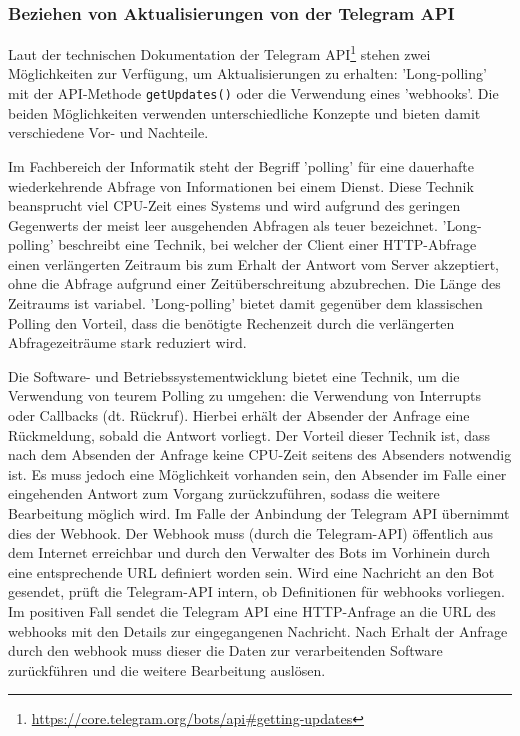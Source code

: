 \subsubsection{Beziehen von Aktualisierungen von der Telegram API}
\label{sec:telegram-getting-updates}

Laut der technischen Dokumentation der Telegram API\footnote{\url{https://core.telegram.org/bots/api\#getting-updates}} stehen zwei Möglichkeiten zur Verfügung, um Aktualisierungen zu erhalten: 'Long-polling' mit der API-Methode \lstinline{getUpdates()} oder die Verwendung eines 'webhooks'. Die beiden Möglichkeiten verwenden unterschiedliche Konzepte und bieten damit verschiedene Vor- und Nachteile. 

Im Fachbereich der Informatik steht der Begriff 'polling' für eine dauerhafte wiederkehrende Abfrage von Informationen bei einem Dienst. Diese Technik beansprucht viel CPU-Zeit eines Systems und wird aufgrund des geringen Gegenwerts der meist leer ausgehenden Abfragen als teuer bezeichnet. 'Long-polling' beschreibt eine Technik, bei welcher der Client einer HTTP-Abfrage einen verlängerten Zeitraum bis zum Erhalt der Antwort vom Server akzeptiert, ohne die Abfrage aufgrund einer Zeitüberschreitung abzubrechen. Die Länge des Zeitraums ist variabel. 'Long-polling' bietet damit gegenüber dem klassischen Polling den Vorteil, dass die benötigte Rechenzeit durch die verlängerten Abfragezeiträume stark reduziert wird. 

Die Software- und Betriebssystementwicklung bietet eine Technik, um die Verwendung von teurem Polling zu umgehen: die Verwendung von Interrupts oder Callbacks (dt. Rückruf). Hierbei erhält der Absender der Anfrage eine Rückmeldung, sobald die Antwort vorliegt. Der Vorteil dieser Technik ist, dass nach dem Absenden der Anfrage keine CPU-Zeit seitens des Absenders notwendig ist. Es muss jedoch eine Möglichkeit vorhanden sein, den Absender im Falle einer eingehenden Antwort zum Vorgang zurückzuführen, sodass die weitere Bearbeitung möglich wird. Im Falle der Anbindung der Telegram API übernimmt dies der Webhook. Der Webhook muss (durch die Telegram-API) öffentlich aus dem Internet erreichbar und durch den Verwalter des Bots im Vorhinein durch eine entsprechende URL definiert worden sein. Wird eine Nachricht an den Bot gesendet, prüft die Telegram-API intern, ob Definitionen für webhooks vorliegen. Im positiven Fall sendet die Telegram API eine HTTP-Anfrage an die URL des webhooks mit den Details zur eingegangenen Nachricht. Nach Erhalt der Anfrage durch den webhook muss dieser die Daten zur verarbeitenden Software zurückführen und die weitere Bearbeitung auslösen.

